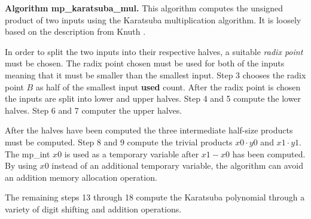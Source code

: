 \documentclass[b5paper]{book}
\begin{document}
\textbf{Algorithm mp\_karatsuba\_mul.}
This algorithm computes the unsigned product of two inputs using the Karatsuba multiplication algorithm.  It is loosely based on the description
from Knuth \cite[pp. 294-295]{TAOCPV2}.  

In order to split the two inputs into their respective halves, a suitable \textit{radix point} must be chosen.  The radix point chosen must
be used for both of the inputs meaning that it must be smaller than the smallest input.  Step 3 chooses the radix point $B$ as half of the 
smallest input \textbf{used} count.  After the radix point is chosen the inputs are split into lower and upper halves.  Step 4 and 5 
compute the lower halves.  Step 6 and 7 computer the upper halves.  

After the halves have been computed the three intermediate half-size products must be computed.  Step 8 and 9 compute the trivial products
$x0 \cdot y0$ and $x1 \cdot y1$.  The mp\_int $x0$ is used as a temporary variable after $x1 - x0$ has been computed.  By using $x0$ instead
of an additional temporary variable, the algorithm can avoid an addition memory allocation operation.

The remaining steps 13 through 18 compute the Karatsuba polynomial through a variety of digit shifting and addition operations.
\end{document}
